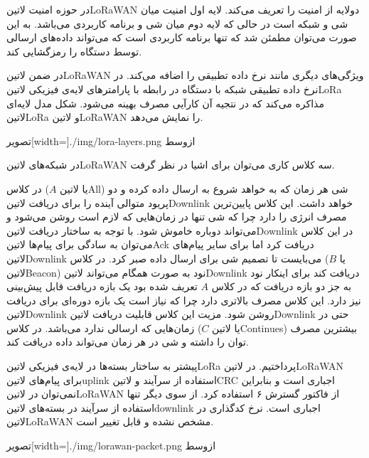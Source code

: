 در حوزه امنیت ‌لاتین{LoRaWAN} دولایه از امنیت را تعریف می‌کند. لایه اول امنیت میان شی و شبکه است در حالی که لایه دوم میان شی و برنامه کاربردی می‌باشد.
به این صورت می‌توان مطمئن شد که تنها برنامه کاربردی است که می‌تواند داده‌های ارسالی توسط دستگاه را رمزگشایی کند.

در ضمن ‌لاتین{LoRaWAN} ویژگی‌های دیگری مانند نرخ داده تطبیقی را اضافه می‌کند. در نرخ داده تطبیقی شبکه با دستگاه در رابطه با پارامترهای لایه‌ی فیزیکی ‌لاتین{LoRa} مذاکره می‌کند
که در نتجیه آن کارآیی مصرف بهینه می‌شود. شکل  مدل لایه‌ای ‌لاتین{LoRa} و ‌لاتین{LoRaWAN} را نمایش می‌دهد.

‌تصویر[width=\textwidth]{./img/lora-layers.png}
‌ازوسط

در شبکه‌های ‌لاتین{LoRaWAN} سه کلاس کاری می‌توان برای اشیا در نظر گرفت.

 در کلاس ($A$ یا ‌لاتین{All}) شی هر زمان که به خواهد شروع به ارسال داده کرده و دو پریود متوالی آینده را برای دریافت ‌لاتین{Downlink} خواهد داشت. این کلاس پایین‌ترین مصرف انرژی را دارد چرا که شی تنها در زمان‌هایی که لازم است
روشن می‌شود و می‌تواند دوباره خاموش شود. با توجه به ساختار دریافت ‌لاتین{Downlink} در این کلاس می‌توان به سادگی برای پیام‌ها ‌لاتین{Ack} دریافت کرد اما برای سایر پیام‌های ‌لاتین{Downlink} می‌بایست تا تصمیم شی برای ارسال داده صبر کرد.
 در کلاس ($B$ یا ‌لاتین{Beacon}) نود به صورت همگام می‌تواند ‌لاتین{Downlink} دریافت کند برای اینکار نود به جز دو بازه دریافت که در کلاس $A$ تعریف شده بود یک بازه دریافت قابل پیش‌بینی نیز دارد.
این کلاس مصرف بالاتری دارد چرا که نیاز است یک بازه دوره‌ای برای دریافت ‌لاتین{Downlink} روشن شود. مزیت این کلاس قابلیت دریافت ‌لاتین{Downlink} حتی در زمان‌هایی که ارسالی ندارد می‌باشد.
 در کلاس ($C$ یا ‌لاتین{Continues}) بیشترین مصرف توان را داشته و شی در هر زمان می‌تواند داده دریافت کند.

پیشتر به ساختار بسته‌ها در لایه‌ی فیزیکی ‌لاتین{LoRa} پرداختیم. در ‌لاتین{LoRaWAN} برای پیام‌های ‌لاتین{uplink} استفاده از سرآیند و ‌لاتین{CRC} اجباری است
و بنابراین نمی‌توان در ‌لاتین{LoRaWAN} از فاکتور گسترش ۶ استفاده کرد. از سوی دیگر تنها استفاده از سرآیند در بسته‌های ‌لاتین{downlink} اجباری است.
نرخ کدگذاری در ‌لاتین{LoRaWAN} مشخص نشده و قابل تغییر است.

‌تصویر[width=\textwidth]{./img/lorawan-packet.png}
‌ازوسط

